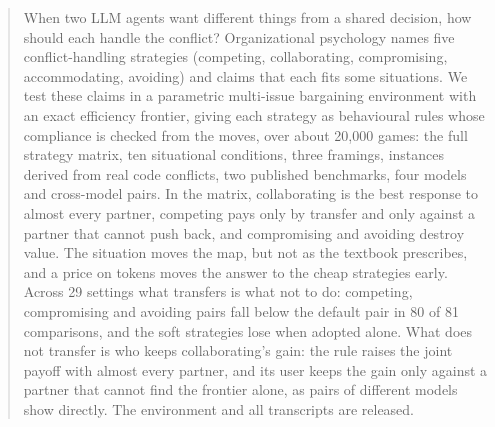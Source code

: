 \begin{abstract}
When two LLM agents want different things from a shared decision, how should each handle the conflict? Organizational psychology names five conflict-handling strategies (competing, collaborating, compromising, accommodating, avoiding) and claims that each fits some situations. We test these claims in a parametric multi-issue bargaining environment with an exact efficiency frontier, giving each strategy as behavioural rules whose compliance is checked from the moves, over about 20{,}000 games: the full strategy matrix, ten situational conditions, three framings, instances derived from real code conflicts, two published benchmarks, four models and cross-model pairs. In the matrix, collaborating is the best response to almost every partner, competing pays only by transfer and only against a partner that cannot push back, and compromising and avoiding destroy value. The situation moves the map, but not as the textbook prescribes, and a price on tokens moves the answer to the cheap strategies early. Across 29 settings what transfers is what not to do: competing, compromising and avoiding pairs fall below the default pair in 80 of 81 comparisons, and the soft strategies lose when adopted alone. What does not transfer is who keeps collaborating's gain: the rule raises the joint payoff with almost every partner, and its user keeps the gain only against a partner that cannot find the frontier alone, as pairs of different models show directly. The environment and all transcripts are released.
\end{abstract}

